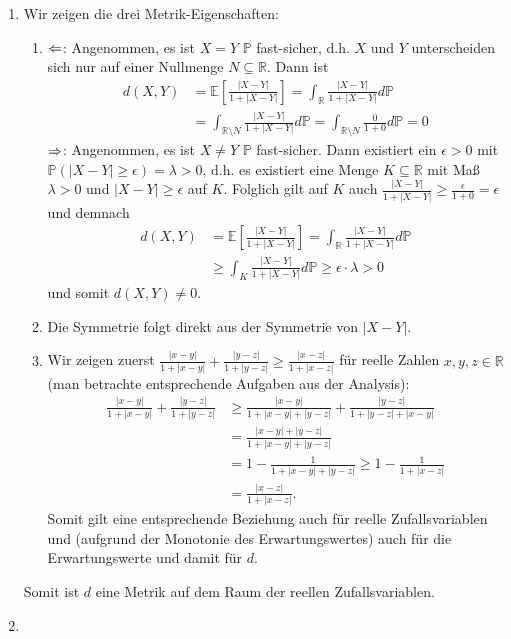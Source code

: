\documentclass[a4paper]{article}
\begin{document}
\begin{enumerate}[label=(\alph*)]
    \item Wir zeigen die drei Metrik-Eigenschaften:
    \begin{enumerate}[label=(\roman*)]
        \item $\Leftarrow$: Angenommen, es ist $X = Y$ $\mathds{P}$ fast-sicher, d.h. $X$ und $Y$ unterscheiden sich nur auf einer Nullmenge $N \subseteq \mathds{R}$. Dann ist
        \begin{align*}
            d(X,Y) &= \mathds{E}\left[\frac{|X-Y|}{1 + |X-Y|}\right] = \int_\mathds{R} \frac{|X-Y|}{1 + |X-Y|} d\mathds{P}\\
            &= \int_{\mathds{R} \setminus N} \frac{|X-Y|}{1 + |X-Y|} d\mathds{P} = \int_{\mathds{R} \setminus N} \frac{0}{1 + 0} d\mathds{P} = 0
        \end{align*}
        $\Rightarrow$: Angenommen, es ist $X \neq Y$ $\mathds{P}$ fast-sicher.
        Dann existiert ein $\epsilon > 0$ mit $\mathds{P}(|X - Y| \geq \epsilon) = \lambda > 0$, d.h. es existiert eine Menge $K \subseteq \mathds{R}$ mit Maß $\lambda > 0$ und $|X-Y| \geq \epsilon$ auf $K$.
        Folglich gilt auf $K$ auch $\frac{|X-Y|}{1+ |X-Y|} \geq \frac{\epsilon}{1 + 0} = \epsilon$ und demnach
        \begin{align*}
            d(X,Y) &= \mathds{E}\left[ \frac{|X-Y|}{1+|X-Y|} \right] = \int_\mathds{R} \frac{|X-Y|}{1+|X-Y|} d\mathds{P} \\
            &\geq \int_K \frac{|X-Y|}{1+|X-Y|} d\mathds{P} \geq \epsilon \cdot \lambda > 0
        \end{align*}
        und somit $d(X,Y) \neq 0$.
        \item Die Symmetrie folgt direkt aus der Symmetrie von $|X-Y|$.
        \item Wir zeigen zuerst $\frac{|x-y|}{1 + |x-y|} + \frac{|y-z|}{1 + |y-z|} \geq \frac{|x-z|}{1+|x-z|}$ für reelle Zahlen $x,y,z \in \mathds{R}$ (man betrachte entsprechende Aufgaben aus der Analysis):
        \begin{align*}
            \frac{|x-y|}{1 + |x-y|} + \frac{|y-z|}{1 + |y-z|}  &\geq \frac{|x-y|}{1 + |x-y| + |y-z|} + \frac{|y-z|}{1 + |y-z| + |x-y|}\\
            &= \frac{|x-y| + |y-z|}{1 + |x-y| + |y-z|}\\
            &= 1 - \frac{1}{1 +|x-y| + |y-z| } \geq 1 - \frac{1}{1+|x-z|}\\
            &= \frac{|x-z|}{1 + |x-z|}\text{.}
        \end{align*}
        Somit gilt eine entsprechende Beziehung auch für reelle Zufallsvariablen und (aufgrund der Monotonie des Erwartungswertes) auch für die Erwartungswerte und damit für $d$.
    \end{enumerate}
    Somit ist $d$ eine Metrik auf dem Raum der reellen Zufallsvariablen.
    \item 
\end{enumerate}
\end{document}
